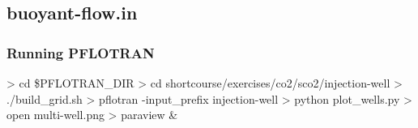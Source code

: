 \documentclass{beamer}
\begin{document}
\subsection{buoyant-flow.in}

\begin{frame}[fragile]\frametitle{Running PFLOTRAN}

\begin{semiverbatim}

> cd \$PFLOTRAN_DIR
> cd shortcourse/exercises/co2/sco2/injection-well
> ./build_grid.sh
> pflotran -input_prefix injection-well
> python plot_wells.py
> open multi-well.png
> paraview \&

\end{semiverbatim}

\end{frame}
\end{document}
